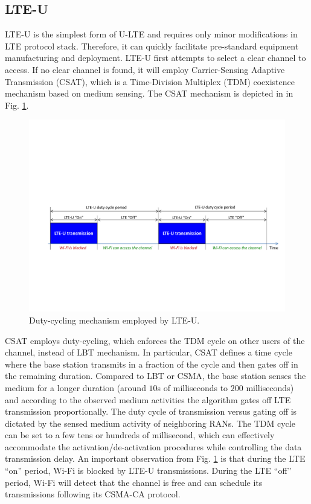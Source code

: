 \subsection{LTE-U}
\mbox{LTE-U} is the simplest form of \mbox{U-LTE} and requires only minor modifications in LTE protocol stack. Therefore, it can quickly facilitate pre-standard equipment manufacturing and deployment. \mbox{LTE-U} first attempts to select a clear channel to access. If no clear channel is found, it will employ Carrier-Sensing Adaptive Transmission (CSAT), which is a Time-Division Multiplex (TDM) coexistence mechanism based on medium sensing. The CSAT mechanism is depicted in in Fig. \ref{figs:LTE-U}.
\begin{figure}[!ht]
	\centering
	\includegraphics[width=\textwidth]{figs/LTE-U}
	\caption{Duty-cycling mechanism employed by \mbox{LTE-U}.}
	\label{figs:LTE-U}
\end{figure}
CSAT employs duty-cycling, which enforces the TDM cycle on other users of the channel, instead of LBT mechanism.  In particular, CSAT defines a time cycle where the base station transmits in a fraction of the cycle and then gates off in the remaining duration. Compared to LBT or CSMA, the base station senses the medium for a longer duration (around $10$s of milliseconds to $200$ milliseconds) and according to the observed medium activities the algorithm gates off LTE transmission proportionally.  The duty cycle of transmission versus gating off is dictated by the sensed medium activity of neighboring RANs. The TDM cycle can be set to a few tens or hundreds of millisecond, which can effectively accommodate the activation/de-activation procedures while controlling the data transmission delay. An important observation from Fig. \ref{figs:LTE-U} is that during the LTE ``on'' period, \mbox{Wi-Fi} is blocked by \mbox{LTE-U} transmissions. During the LTE ``off'' period, \mbox{Wi-Fi} will detect that the channel is free and can schedule its transmissions following its CSMA-CA protocol.

